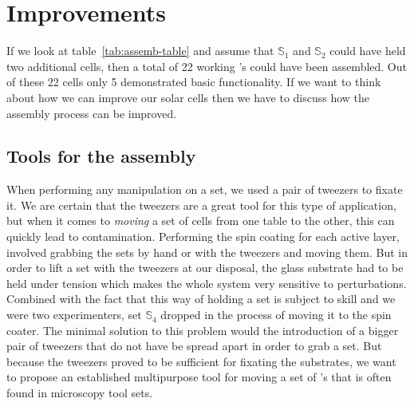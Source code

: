 
\section{Improvements}\label{sec:improvements}
If we look at table~\ref{tab:assemb-table} and assume that $\mathbb{S}_1$ and $\mathbb{S}_2$ could have held two additional cells, then a total of 22 working \BHSC’s could have been assembled. Out of these 22 cells only 5 demonstrated basic functionality. If we want to think about how we can improve our solar cells then we have to discuss how the assembly process can be improved.

\subsection{Tools for the assembly}
When performing any manipulation on a set, we used a pair of tweezers to fixate it. We are certain that the tweezers are a great tool for this type of application, but when it comes to \emph{moving} a set of cells from one table to the other, this can quickly lead to contamination. Performing the spin coating for each active layer, involved grabbing the sets by hand or with the tweezers and moving them. But in order to lift a set with the tweezers at our disposal, the glass substrate had to be held under tension which makes the whole system very sensitive to perturbations. Combined with the fact that this way of holding a set is subject to skill and we were two experimenters, set $\mathbb{S}_4$ dropped in the process of moving it to the spin coater.\mypar
The minimal solution to this problem would the introduction of a bigger pair of tweezers that do not have be spread apart in order to grab a set. But because the tweezers proved to be sufficient for fixating the substrates, we want to propose an established multipurpose tool for moving a set of \BHSC's that is often found in microscopy tool sets.

